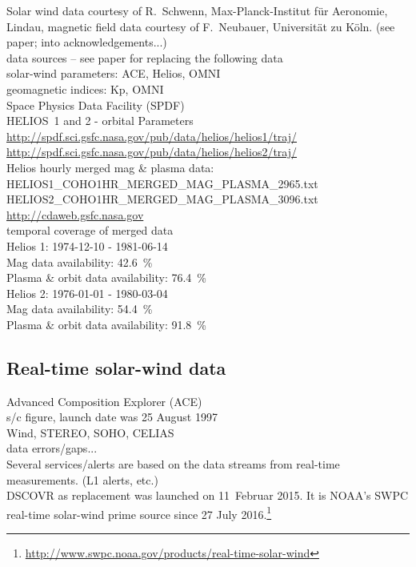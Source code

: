 Solar wind data courtesy of R.~Schwenn, Max-Planck-Institut für Aeronomie, Lindau, magnetic field data courtesy of F.~Neubauer, Universität zu Köln. (see paper; into acknowledgements...)\\




data sources -- see paper for replacing the following data\\
solar-wind parameters: ACE, Helios, OMNI\\
geomagnetic indices: Kp, OMNI\\

Space Physics Data Facility (SPDF)\\

HELIOS~1 and 2 - orbital Parameters\\
\url{http://spdf.sci.gsfc.nasa.gov/pub/data/helios/helios1/traj/}\\
\url{http://spdf.sci.gsfc.nasa.gov/pub/data/helios/helios2/traj/}\\

Helios hourly merged mag \& plasma data:\\
HELIOS1\_COHO1HR\_MERGED\_MAG\_PLASMA\_2965.txt\\
HELIOS2\_COHO1HR\_MERGED\_MAG\_PLASMA\_3096.txt\\
\url{http://cdaweb.gsfc.nasa.gov}\\
temporal coverage of merged data\\
Helios 1: 1974-12-10 - 1981-06-14\\
Mag data availability: 42.6~\%\\
Plasma \& orbit data availability: 76.4~\%\\
Helios 2: 1976-01-01 - 1980-03-04\\
Mag data availability: 54.4~\%\\
Plasma \& orbit data availability: 91.8~\%\\


\subsection{Real-time solar-wind data}

Advanced Composition Explorer (ACE)\\
s/c figure, launch date was 25 August 1997\\

Wind, STEREO, SOHO, CELIAS\\

data errors/gaps...\\
Several services/alerts are based on the data streams from real-time measurements. (L1 alerts, etc.)\\

DSCOVR as replacement was launched on 11~Februar 2015. It is NOAA's SWPC real-time solar-wind prime source since 27 July 2016.\footnote{\url{http://www.swpc.noaa.gov/products/real-time-solar-wind}}\\
